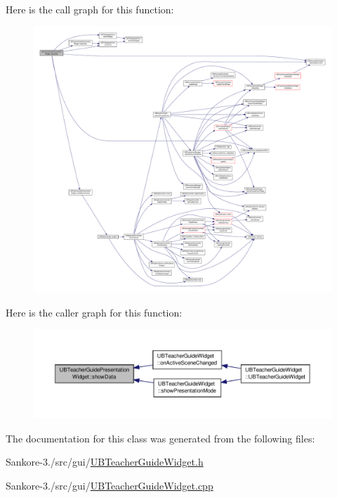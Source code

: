 Here is the call graph for this function\-:
\nopagebreak
\begin{figure}[H]
\begin{center}
\leavevmode
\includegraphics[width=350pt]{d2/d4d/class_u_b_teacher_guide_presentation_widget_a2b14d1075ff462fda6c3bba0b00a2b36_cgraph}
\end{center}
\end{figure}




Here is the caller graph for this function\-:
\nopagebreak
\begin{figure}[H]
\begin{center}
\leavevmode
\includegraphics[width=350pt]{d2/d4d/class_u_b_teacher_guide_presentation_widget_a2b14d1075ff462fda6c3bba0b00a2b36_icgraph}
\end{center}
\end{figure}




The documentation for this class was generated from the following files\-:\begin{DoxyCompactItemize}
\item 
Sankore-\/3./src/gui/\hyperlink{_u_b_teacher_guide_widget_8h}{U\-B\-Teacher\-Guide\-Widget.\-h}\item 
Sankore-\/3./src/gui/\hyperlink{_u_b_teacher_guide_widget_8cpp}{U\-B\-Teacher\-Guide\-Widget.\-cpp}\end{DoxyCompactItemize}
